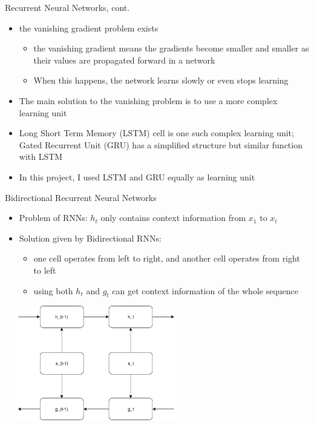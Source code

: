 \documentclass{beamer}
\begin{document}
\begin{frame}{Recurrent Neural Networks, cont.}
    \begin{itemize}
        \item the vanishing gradient problem exists
            \begin{itemize}
                \item the vanishing gradient means the gradients become smaller and smaller as their values are propagated forward in a network
                \item When this happens, the network learns slowly or even stops learning
            \end{itemize}
        \item The main solution to the vanishing problem is to use a more complex learning unit
        \item Long Short Term Memory (LSTM) cell is one such complex learning unit; Gated Recurrent Unit (GRU) has a simplified structure but similar function with LSTM
        \item In this project, I used LSTM and GRU equally as learning unit
    \end{itemize}
\end{frame}

\begin{frame}{Bidirectional Recurrent Neural Networks}
    \begin{itemize}
        \item Problem of RNNs: $h_t$ only contains context information from $x_1$ to $x_t$
        \item Solution given by Bidirectional RNNs:
        \begin{itemize}
            \item one cell operates from left to right, and another cell operates from right to left
            \item using both $h_t$ and $g_t$ can get context information of the whole sequence
        \end{itemize}
    \end{itemize}

    \begin{center}
        \includegraphics[width=8cm, height=5cm]{figures/bidirectionalRnn.png}
    \end{center}

\end{frame}
\end{document}
